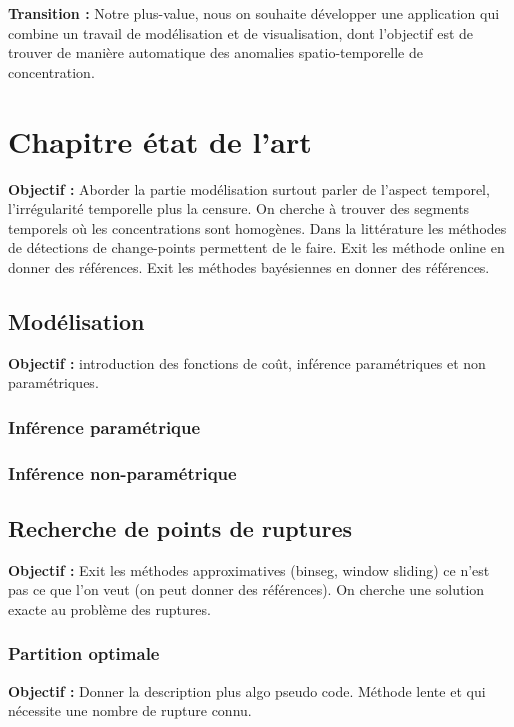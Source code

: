 \documentclass[12pt, twoside]{report}
\begin{document}
\textbf{Transition :} Notre plus-value, nous on souhaite développer une application qui combine un travail de modélisation et de visualisation, dont l'objectif est de trouver de manière automatique des anomalies spatio-temporelle de concentration.    

\chapter{Chapitre état de l'art}

\textbf{Objectif :} Aborder la partie modélisation surtout parler de l'aspect temporel, l'irrégularité temporelle plus la censure. On cherche à trouver des segments temporels où les concentrations sont homogènes. Dans la littérature les méthodes de détections de change-points permettent de le faire. Exit les méthode online en donner des références. Exit les méthodes bayésiennes en donner des références.

\section{Modélisation}

\textbf{Objectif :} introduction des fonctions de coût, inférence paramétriques et non paramétriques.

\subsection{Inférence paramétrique}
\subsection{Inférence non-paramétrique}

\section{Recherche de points de ruptures}

\textbf{Objectif :} Exit les méthodes approximatives (binseg, window sliding) ce n'est pas ce que l'on veut (on peut donner des références). On cherche une solution exacte au problème des ruptures.

\subsection{Partition optimale}

\textbf{Objectif :} Donner la description plus algo pseudo code. Méthode lente et qui nécessite une nombre de rupture connu. 
\end{document}
